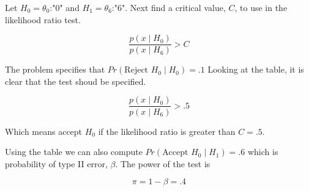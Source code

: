 \documentclass{tufte-book}
\theoremstyle{mytheoremstyle}
\theoremstyle{mylemstyle}
\theoremstyle{mydefstyle}
\begin{document}
\begin{table}
\end{table}

Let $H_0=\theta_0$:"$0$" and $H_1=\theta_6$:"$6$".  Next find a critical value, $C$, to use in the likelihood ratio test.

\[ \frac{p(x\mid H_0)}{p(x\mid H_6)} > C \]

The problem specifies that $Pr(\text{Reject }H_0 \mid H_0)=.1$  Looking at the table, it is clear that the test shoud be specified.


\[ \frac{p(x\mid H_0)}{p(x\mid H_6)} > .5 \]

Which means accept $H_0$ if the likelihood ratio is greater than   $C=.5$.

Using the table we can also compute $Pr(\text{Accept }H_0 \mid H_1) = .6$ which is probability of type II error, $\beta$.  The power of the test is

\[ \pi = 1- \beta = .4 \]
\end{document}

